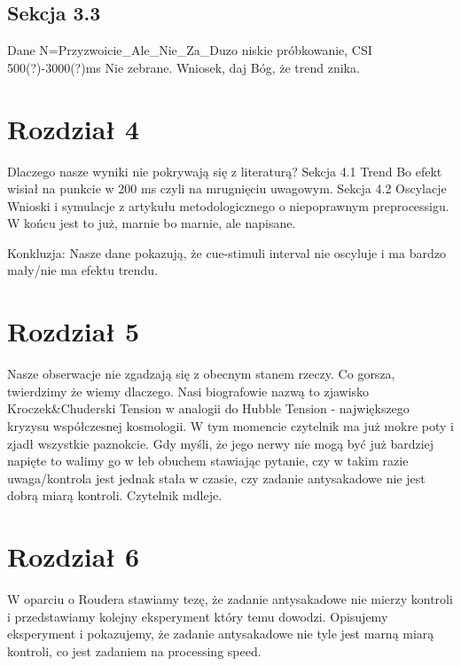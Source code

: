 \documentclass[
  man,draftall]{apa6}
\begin{document}
\hypertarget{sekcja-3.3}{%
\subsection{Sekcja 3.3}\label{sekcja-3.3}}

Dane N=Przyzwoicie\_Ale\_Nie\_Za\_Duzo niskie próbkowanie, CSI 500(?)-3000(?)ms Nie zebrane.
Wniosek, daj Bóg, że trend znika.

\hypertarget{rozdziaux142-4}{%
\section{Rozdział 4}\label{rozdziaux142-4}}

Dlaczego nasze wyniki nie pokrywają się z literaturą?
Sekcja 4.1 Trend
Bo efekt wisiał na punkcie w 200 ms czyli na mrugnięciu uwagowym.
Sekcja 4.2 Oscylacje
Wnioski i symulacje z artykułu metodologicznego o niepoprawnym preprocessigu. W końcu jest to już, marnie bo marnie, ale napisane.

Konkluzja: Nasze dane pokazują, że cue-stimuli interval nie oscyluje i ma bardzo mały/nie ma efektu trendu.

\hypertarget{rozdziaux142-5}{%
\section{Rozdział 5}\label{rozdziaux142-5}}

Nasze obserwacje nie zgadzają się z obecnym stanem rzeczy. Co gorsza, twierdzimy że wiemy dlaczego. Nasi biografowie nazwą to zjawisko Kroczek\&Chuderski Tension w analogii do Hubble Tension - największego kryzysu współczesnej kosmologii. W tym momencie czytelnik ma już mokre poty i zjadł wszystkie paznokcie. Gdy myśli, że jego nerwy nie mogą być już bardziej napięte to walimy go w łeb obuchem stawiając pytanie, czy w takim razie uwaga/kontrola jest jednak stała w czasie, czy zadanie antysakadowe nie jest dobrą miarą kontroli. Czytelnik mdleje.

\hypertarget{rozdziaux142-6}{%
\section{Rozdział 6}\label{rozdziaux142-6}}

W oparciu o Roudera stawiamy tezę, że zadanie antysakadowe nie mierzy kontroli i przedstawiamy kolejny eksperyment który temu dowodzi.
Opisujemy eksperyment i pokazujemy, że zadanie antysakadowe nie tyle jest marną miarą kontroli, co jest zadaniem na processing speed.
\end{document}
